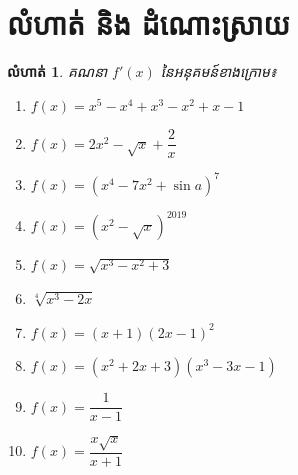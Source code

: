 \documentclass[12pt,fleqn]{book} %
\newtheorem{exercise}{\kml លំហាត់}
\begin{document}
\newpage 
\section{លំហាត់ និង ដំណោះស្រាយ}
\begin{exercise}
គណនា $f'(x)$ នៃអនុគមន៍ខាងក្រោម៖
\begin{multicols}{2}
\begin{enumerate}
\item $f(x)=x^5-x^4+x^3-x^2+x-1$
\item $f(x)=2x^2-\sqrt{x}+\dfrac{2}{x}$
\item $f(x)=(x^4-7x^2+\sin a)^7$
\item $f(x)=(x^2-\sqrt{x})^{2019}$
\item $f(x)=\sqrt{x^3-x^2+3}$
\item $\sqrt[4]{x^3-2x}$
\item $f(x)=(x+1)(2x-1)^2$
\item $f(x)=(x^2+2x+3)(x^3-3x-1)$
\item $f(x)=\dfrac{1}{x-1}$
\item $f(x)=\dfrac{x\sqrt{x}}{x+1}$

\end{enumerate}
\end{multicols}
\end{exercise}
\end{document}
